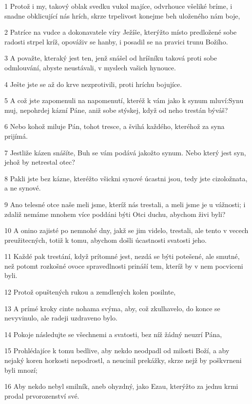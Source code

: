\par 1 Protož i my, takový oblak svedku vukol majíce, odvrhouce všeliké bríme, i snadne obklicující nás hrích, skrze trpelivost konejme beh uloženého nám boje,
\par 2 Patríce na vudce a dokonavatele víry Ježíše, kterýžto místo predložené sobe radosti strpel kríž, opováživ se hanby, i posadil se na pravici trunu Božího.
\par 3 A považte, kteraký jest ten, jenž snášel od hríšníku taková proti sobe odmlouvání, abyste neustávali, v myslech vašich hynouce.
\par 4 Ješte jste se až do krve nezprotivili, proti hríchu bojujíce.
\par 5 A což jste zapomenuli na napomenutí, kteréž k vám jako k synum mluví:Synu muj, nepohrdej kázní Páne, aniž sobe stýskej, když od neho trestán býváš?
\par 6 Nebo kohož miluje Pán, tohot tresce, a švihá každého, kteréhož za syna prijímá.
\par 7 Jestliže kázen snášíte, Buh se vám podává jakožto synum. Nebo který jest syn, jehož by netrestal otec?
\par 8 Pakli jste bez kázne, kteréžto všickni synové úcastni jsou, tedy jste cizoložnata, a ne synové.
\par 9 Ano telesné otce naše meli jsme, kteríž nás trestali, a meli jsme je u vážnosti; i zdaliž nemáme mnohem více poddáni býti Otci duchu, abychom živi byli?
\par 10 A onino zajisté po nemnohé dny, jakž se jim videlo, trestali, ale tento v vecech preužitecných, totiž k tomu, abychom došli úcastnosti svatosti jeho.
\par 11 Každé pak trestání, když prítomné jest, nezdá se býti potešené, ale smutné, než potomt rozkošné ovoce spravedlnosti prináší tem, kteríž by v nem pocviceni byli.
\par 12 Protož opuštených rukou a zemdlených kolen posilnte,
\par 13 A prímé kroky cinte nohama svýma, aby, což zkulhavelo, do konce se nevyvinulo, ale radeji uzdraveno bylo.
\par 14 Pokoje následujte se všechnemi a svatosti, bez níž žádný neuzrí Pána,
\par 15 Prohlédajíce k tomu bedlive, aby nekdo neodpadl od milosti Boží, a aby nejaký koren horkosti nepodrostl, a neucinil prekážky, skrze nejž by poškvrneni byli mnozí;
\par 16 Aby nekdo nebyl smilník, aneb ohyzdný, jako Ezau, kterýžto za jednu krmi prodal prvorozenství své.
